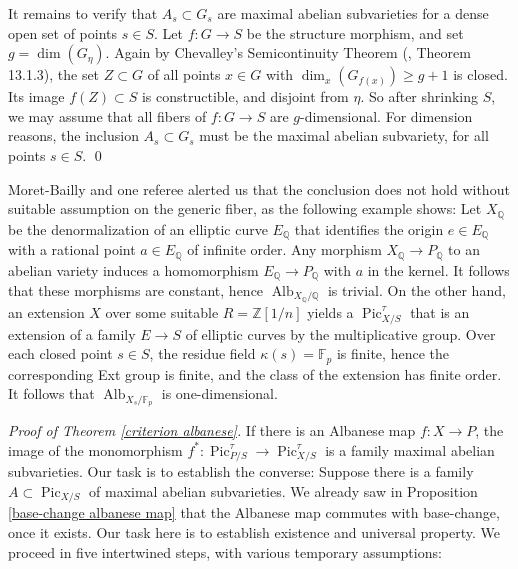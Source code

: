 \documentclass[oneside, 12pt]{amsart}
\theoremstyle{definition}
\theoremstyle{remark}
\newcommand{\ZZ}{\mathbb{Z}}
\newcommand{\QQ}{\mathbb{Q}}
\newcommand{\FF}{\mathbb{F}}
\newcommand{\Alb}{\operatorname{Alb}}
\newcommand{\Pic}{\operatorname{Pic}}
\newcommand{\ra}{\rightarrow}
\begin{document}
It remains to verify that  $A_s\subset G_s$ are maximal abelian subvarieties
for a dense open set of points $s\in S$. Let $f:G\ra S$ be the structure morphism, and set $g=\dim(G_\eta)$.
Again by Chevalley's Semicontinuity Theorem (\cite{EGA IVc}, Theorem 13.1.3), the set $Z\subset G$
of all points $x\in G$ with $\dim_x(G_{f(x)})\geq g+1$ is closed. Its image $f(Z)\subset S$ is constructible,
and disjoint from $\eta$. So after shrinking $S$, we may assume that all fibers of $f:G\ra S$ are $g$-dimensional.
For dimension reasons, the inclusion $A_s\subset G_s$ must be the maximal abelian subvariety, for all points $s\in S$.
\qed

\medskip
Moret-Bailly and one referee   alerted us that the conclusion  does not hold without suitable assumption
on the generic fiber, as the following example shows: Let   $X_\QQ$ be the denormalization of an elliptic curve $E_\QQ$ that identifies
the origin $e\in E_\QQ$ with a rational point $a\in E_\QQ$ of  infinite order. Any morphism $X_\QQ\ra P_\QQ$ to an abelian variety
induces a homomorphism $E_\QQ\ra P_\QQ$ with $a$ in the kernel. It follows that these morphisms are constant,
hence $\Alb_{X_\QQ/\QQ}$ is trivial. On the other hand, an extension $X$ over some suitable $R=\ZZ[1/n]$ 
yields a $\Pic^\tau_{X/S}$ that is an extension of a family $E\ra S$ of elliptic curves by the multiplicative group.
Over each closed point $s\in S$, the residue field $\kappa(s)=\FF_p$ is finite, hence the corresponding Ext group is finite, and
the class of the extension has finite order.
It follows that $\Alb_{X_s/\FF_p}$ is one-dimensional.
\bigskip

\emph{Proof of Theorem \ref{criterion albanese}.} 
If there is an Albanese map $f:X\ra P$, the image of the monomorphism $f^*:\Pic^\tau_{P/S}\ra \Pic^\tau_{X/S}$ is a
family maximal abelian subvarieties. Our task is to establish the converse: Suppose there
is a family $A\subset\Pic_{X/S}$ of maximal abelian subvarieties.
We already saw in Proposition \ref{base-change albanese map} that the Albanese map commutes with base-change, once it exists.
Our task here is  to establish   existence and universal property.   We proceed in five intertwined steps,
with various temporary assumptions:
 
\end{document}
